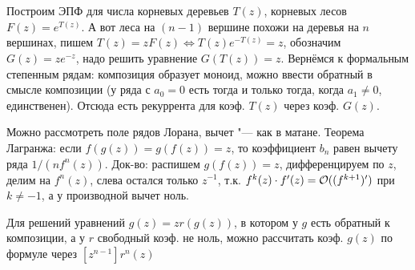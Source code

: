 \section{} %
	Построим ЭПФ для числа корневых деревьев $T(z)$, корневых лесов $F(z)=e^{T(z)}$.
	А вот леса на $(n-1)$ вершине похожи на деревья на $n$ вершинах, пишем $T(z)=zF(z) \iff T(z)e^{-T(z)}=z$,
	обозначим $G(z)=ze^{-z}$, надо решить уравнение $G(T(z))=z$.
	Вернёмся к формальным степенным рядам: композиция образует моноид,
	можно ввести обратный в смысле композиции (у ряда с $a_0=0$ есть тогда и только тогда,
	когда $a_1 \neq 0$, единственен).
	Отсюда есть рекуррента для коэф. $T(z)$ через коэф. $G(z)$.

	Можно рассмотреть поле рядов Лорана, вычет "--- как в матане.
	Теорема Лагранжа: если $f(g(z))=g(f(z))=z$, то коэффициент $b_n$ равен
	вычету ряда $1/(nf^n(z))$.
	Док-во: распишем $g(f(z))=z$, дифференцируем по $z$, делим на $f^n(z)$,
	слева остался только $z^{-1}$, т.к. $f^k(z)\cdot f'(z)=\mathcal O((f^{k+1})')$ при $k\neq -1$,
	а у производной вычет ноль.

	Для решений уравнений $g(z)=zr(g(z))$, в котором у $g$ есть обратный к композиции,
	а у $r$ свободный коэф. не ноль, можно рассчитать коэф. $g(z)$ по формуле через $[z^{n-1}]r^n(z)$
	\TODO

\section{} %
	\TODO
